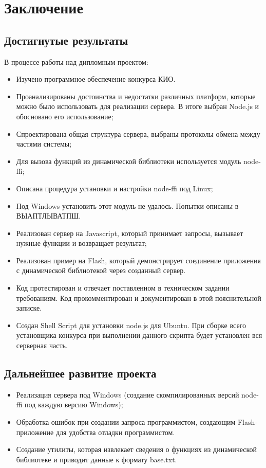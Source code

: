 \chapter{Заключение}
\section{Достигнутые результаты}
В процессе работы над дипломным проектом:
\begin{itemize}
  \item Изучено программное обеспечение конкурса КИО.
  \item Проанализированы достоинства и недостатки различных платформ, которые можно было использовать для реализации сервера. В итоге выбран Node.js и обосновано его использование;
  \item Спроектирована общая структура сервера, выбраны протоколы обмена между частями системы;
  \item Для вызова функций из динамической библиотеки используется модуль node-ffi;
  \item Описана процедура установки и настройки node-ffi под Linux;
  \item Под Windows установить этот модуль не удалось. Попытки описаны в ВЫАПТЛЫВАТПШ. 
  \item Реализован сервер на Javascript, который принимает запросы, вызывает нужные функции и возвращает результат;
  \item Реализован пример на Flash, который демонстрирует соединение приложения с динамической библиотекой через созданный сервер.
  \item Код протестирован и отвечает поставленном в техническом задании требованиям. Код прокомментирован и документирован в этой пояснительной записке.
  \item Создан Shell Script для установки node.js для Ubuntu. При сборке всего установщика конкурса при выполнении данного скрипта будет установлен вся серверная часть. 
\end{itemize}
\section{Дальнейшее развитие проекта}
\begin{itemize}
  \item Реализация сервера под Windows (создание скомпилированных версий node-ffi под каждую версию Windows);
  \item Обработка ошибок при создании запроса программистом, создающим Flash-приложение для удобства отладки программистом.
  \item Создание утилиты, которая извлекает сведения о функциях из динамической библиотеке и приводит данные к формату base.txt.
\end{itemize}
